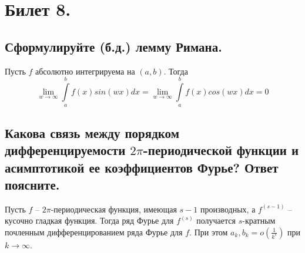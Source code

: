 \section{Билет 8.}

\subsection{Сформулируйте (б.д.) лемму Римана.}
\begin{lemma}
    Пусть $f$ абсолютно интегрируема на $(a,b)$. Тогда
    \[
        \lim_{w \to \infty} \int \limits_a^b f(x) sin(wx) dx = \lim_{w \to \infty} \int \limits_a^b f(x) cos(wx) dx = 0
    \]
\end{lemma}

\subsection{Какова связь между порядком дифференцируемости $2\pi$-периодической функции и асимптотикой ее коэффициентов Фурье? Ответ поясните.}
\begin{statement}
    Пусть $f$ -- $2\pi$-периодическая функция, имеющая $s-1$ производных, а $f^{(s-1)}$ -- кусочно гладкая функция. Тогда ряд Фурье для $f^{(s)}$ получается $s$-кратным почленным дифференцированием ряда Фурье для $f$. При этом $a_k, b_k = o\left( \frac{1}{k^s} \right)$ при $k \to \infty$.
\end{statement}